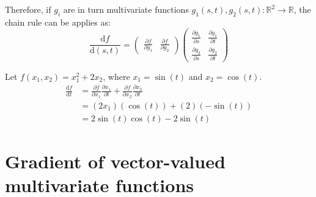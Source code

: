 \begin{description}
        Therefore, if $g_i$ are in turn multivariate functions $g_1(s, t), g_2(s, t): \mathbb{R}^2 \rightarrow \mathbb{R}$,
        the chain rule can be applies as:
        \[
            \frac{\text{d}f}{\text{d}(s, t)} = 
            \begin{pmatrix}
                \frac{\partial f}{\partial g_1} & \frac{\partial f}{\partial g_2}
            \end{pmatrix}
            \begin{pmatrix}
                \frac{\partial g_1}{\partial s} & \frac{\partial g_1}{\partial t} \\ 
                \frac{\partial g_2}{\partial s} & \frac{\partial g_2}{\partial t}
            \end{pmatrix}
        \]

        \begin{example}
            Let $f(x_1, x_2) = x_1^2 + 2x_2$, where $x_1 = \sin(t)$ and $x_2 = \cos(t)$.
            \[
                \begin{split}
                    \frac{\text{d}f}{\text{d}t} & = 
                        \frac{\partial f}{\partial x_1}\frac{\partial x_1}{\partial t} + \frac{\partial f}{\partial x_2}\frac{\partial x_2}{\partial t} \\
                        & = (2x_1)(\cos(t)) + (2)(-\sin(t)) \\
                        & = 2\sin(t)\cos(t) - 2\sin(t)
                \end{split}
            \]
        \end{example}
\end{description}



\section{Gradient of vector-valued multivariate functions}

